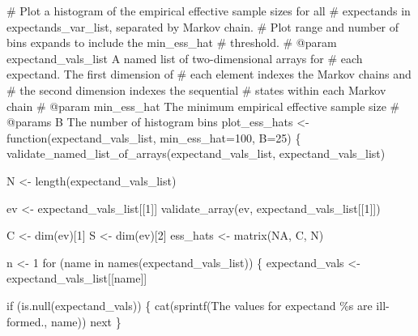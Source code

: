\documentclass[
  letterpaper,
  DIV=11,
  numbers=noendperiod]{scrartcl}
\newenvironment{Shaded}{\begin{snugshade}}{\end{snugshade}}
\newcommand{\BuiltInTok}[1]{\textcolor[rgb]{0.00,0.23,0.31}{#1}}
\newcommand{\CommentTok}[1]{\textcolor[rgb]{0.37,0.37,0.37}{#1}}
\newcommand{\ControlFlowTok}[1]{\textcolor[rgb]{0.00,0.23,0.31}{#1}}
\newcommand{\DecValTok}[1]{\textcolor[rgb]{0.68,0.00,0.00}{#1}}
\newcommand{\KeywordTok}[1]{\textcolor[rgb]{0.00,0.23,0.31}{#1}}
\newcommand{\NormalTok}[1]{\textcolor[rgb]{0.00,0.23,0.31}{#1}}
\newcommand{\OperatorTok}[1]{\textcolor[rgb]{0.37,0.37,0.37}{#1}}
\newcommand{\SpecialCharTok}[1]{\textcolor[rgb]{0.37,0.37,0.37}{#1}}
\newcommand{\StringTok}[1]{\textcolor[rgb]{0.13,0.47,0.30}{#1}}
\begin{document}
\begin{Shaded}
\begin{Highlighting}[]
\CommentTok{\# Plot a histogram of the empirical effective sample sizes for all}
\CommentTok{\# expectands in expectands\_var\_list, separated by Markov chain.}
\CommentTok{\# Plot range and number of bins expands to include the min\_ess\_hat}
\CommentTok{\# threshold.}
\CommentTok{\# @param expectand\_vals\_list A named list of two{-}dimensional arrays for}
\CommentTok{\#                            each expectand.  The first dimension of}
\CommentTok{\#                            each element indexes the Markov chains and}
\CommentTok{\#                            the second dimension indexes the sequential}
\CommentTok{\#                            states within each Markov chain}
\CommentTok{\# @param min\_ess\_hat The minimum empirical effective sample size}
\CommentTok{\# @params B The number of histogram bins}
\NormalTok{plot\_ess\_hats }\OperatorTok{\textless{}{-}}\NormalTok{ function(expectand\_vals\_list,}
\NormalTok{                          min\_ess\_hat}\OperatorTok{=}\DecValTok{100}\NormalTok{, B}\OperatorTok{=}\DecValTok{25}\NormalTok{) \{}
\NormalTok{  validate\_named\_list\_of\_arrays(expectand\_vals\_list,}
                                \StringTok{\textquotesingle{}expectand\_vals\_list\textquotesingle{}}\NormalTok{)}

\NormalTok{  N }\OperatorTok{\textless{}{-}}\NormalTok{ length(expectand\_vals\_list)}

\NormalTok{  ev }\OperatorTok{\textless{}{-}}\NormalTok{ expectand\_vals\_list[[}\DecValTok{1}\NormalTok{]]}
\NormalTok{  validate\_array(ev, }\StringTok{\textquotesingle{}expectand\_vals\_list[[1]]\textquotesingle{}}\NormalTok{)}

\NormalTok{  C }\OperatorTok{\textless{}{-}}\NormalTok{ dim(ev)[}\DecValTok{1}\NormalTok{]}
\NormalTok{  S }\OperatorTok{\textless{}{-}}\NormalTok{ dim(ev)[}\DecValTok{2}\NormalTok{]}
\NormalTok{  ess\_hats }\OperatorTok{\textless{}{-}}\NormalTok{ matrix(NA, C, N)}

\NormalTok{  n }\OperatorTok{\textless{}{-}} \DecValTok{1}
  \ControlFlowTok{for}\NormalTok{ (name }\KeywordTok{in}\NormalTok{ names(expectand\_vals\_list)) \{}
\NormalTok{    expectand\_vals }\OperatorTok{\textless{}{-}}\NormalTok{ expectand\_vals\_list[[name]]}

    \ControlFlowTok{if}\NormalTok{ (}\KeywordTok{is}\NormalTok{.null(expectand\_vals)) \{}
\NormalTok{      cat(sprintf(}\StringTok{\textquotesingle{}The values for expectand \textasciigrave{}}\SpecialCharTok{\%s}\StringTok{\textasciigrave{} are ill{-}formed.\textquotesingle{}}\NormalTok{,}
\NormalTok{                  name))}
      \BuiltInTok{next}
\NormalTok{    \}}


\end{Highlighting}
\end{Shaded}
\end{document}
